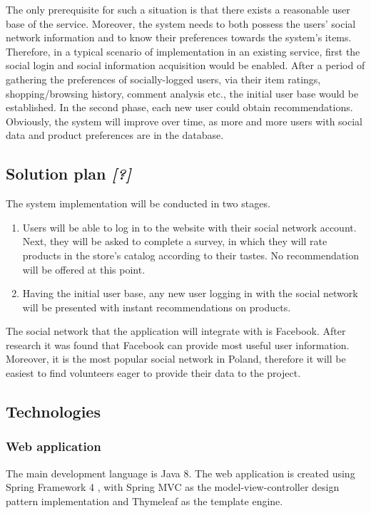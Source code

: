\documentclass[12pt]{report}
\begin{document}
The only prerequisite for such a situation is that there exists a reasonable user base of the service. Moreover, the system needs to both possess the users' social network information and to know their preferences towards the system's items. Therefore, in a typical scenario of implementation in an existing service, first the social login and social information acquisition would be enabled. After a period of gathering the preferences of socially-logged users, via their item ratings, shopping/browsing history, comment analysis etc., the initial user base would be established. In the second phase, each new user could obtain recommendations. Obviously, the system will improve over time, as more and more users with social data and product preferences are in the database.

\subsection{Solution plan \textit{[?]}}

The system implementation will be conducted in two stages.
\begin{enumerate}
\item Users will be able to log in to the website with their social network account. Next, they will be asked to complete a survey, in which they will rate products in the store's catalog according to their tastes. No recommendation will be offered at this point.
\item Having the initial user base, any new user logging in with the social network will be presented with instant recommendations on products.
\end{enumerate}

The social network that the application will integrate with is Facebook. After research it was found that Facebook can provide most useful user information. Moreover, it is the most popular social network in Poland, therefore it will be easiest to find volunteers eager to provide their data to the project.

\subsection{Technologies}
\subsubsection{Web application}
The main development language is Java 8. The web application is created using Spring Framework 4 \cite{spring_framework}, with Spring MVC as the model-view-controller design pattern implementation and Thymeleaf as the template engine. 
\end{document}
